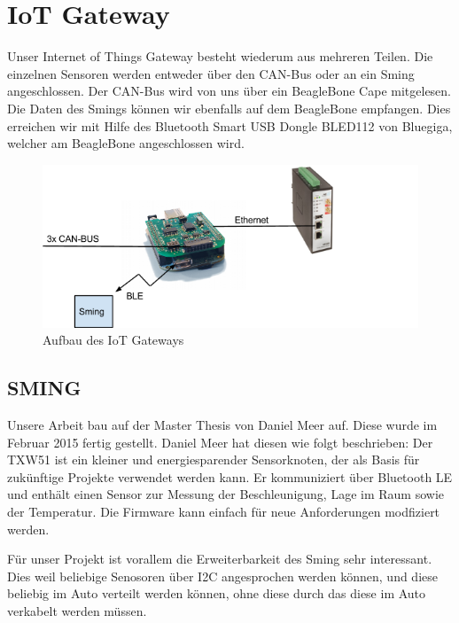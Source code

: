 \chapter{IoT Gateway}
\label{chap:iotgateway}

Unser Internet of Things Gateway besteht wiederum aus mehreren Teilen. Die einzelnen Sensoren werden entweder über den CAN-Bus oder an ein Sming angeschlossen. Der CAN-Bus wird von uns über ein BeagleBone Cape mitgelesen. Die Daten des Smings können wir ebenfalls auf dem BeagleBone empfangen. Dies erreichen wir mit Hilfe des Bluetooth Smart USB Dongle BLED112 von Bluegiga, welcher am BeagleBone angeschlossen wird.

\begin{figure}[hbtp]
    \center
    \includegraphics[width=\textwidth]{bilder/aufbau_in_auto.png}
    \caption{Aufbau des IoT Gateways}
    \label{fig:aufbau_iot_gateway}
\end{figure}


\section{SMING}
\label{sec:sming}

Unsere Arbeit bau auf der Master Thesis von Daniel Meer auf. Diese wurde im Februar 2015 fertig gestellt. Daniel Meer hat diesen wie folgt beschrieben: Der TXW51 ist ein kleiner und energiesparender Sensorknoten, der als Basis für zukünftige Projekte verwendet werden kann. Er kommuniziert über Bluetooth LE und enthält einen Sensor zur Messung der Beschleunigung, Lage im Raum sowie der Temperatur. Die Firmware kann einfach für neue Anforderungen modfiziert werden.

Für unser Projekt ist vorallem die Erweiterbarkeit des Sming sehr interessant. Dies weil beliebige Senosoren über I2C angesprochen werden können, und diese beliebig im Auto verteilt werden können, ohne diese durch das diese im Auto verkabelt werden müssen.



